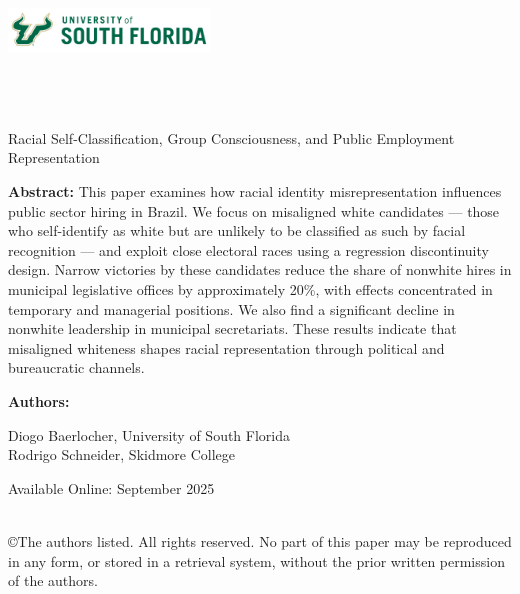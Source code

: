 \documentclass[11pt]{article}
\begin{document}
\onehalfspacing

\noindent \includegraphics[width = 0.4\textwidth]{USouthFlorida-lightbg-2c-rgb-h.png} \\

\noindent{\color{usfgreen} \rule{0.5\textwidth}{10pt}}{\color{usfgold} \rule{0.5\textwidth}{10pt}}\\

 \\
 \\

\vspace*{0.5in}

\begin{center} 
    \huge Racial Self-Classification, Group Consciousness, and Public Employment Representation
\end{center}

\vspace*{0.5in}

\noindent \textbf{Abstract:} This paper examines how racial identity misrepresentation influences public sector hiring in Brazil. We focus on misaligned white candidates — those who self-identify as white but are unlikely to be classified as such by facial recognition — and exploit close electoral races using a regression discontinuity design. Narrow victories by these candidates reduce the share of nonwhite hires in municipal legislative offices by approximately 20\%, with effects concentrated in temporary and managerial positions. We also find a significant decline in nonwhite leadership in municipal secretariats. These results indicate that misaligned whiteness shapes racial representation through political and bureaucratic channels.

\vspace*{0.25in}

\noindent \textbf{Authors:}

Diogo Baerlocher, University of South Florida \\
\indent Rodrigo Schneider, Skidmore College

\vspace*{0.25in}


\noindent Available Online: September 2025 %

\vfill 
\noindent{\color{usfgreen} \rule{\textwidth}{5pt}}\\
\noindent \small ©The authors listed. All rights reserved. No part of this paper may be reproduced in any form, or stored in a retrieval system, without the prior written permission of the authors.
\thispagestyle{empty}
\end{document}

